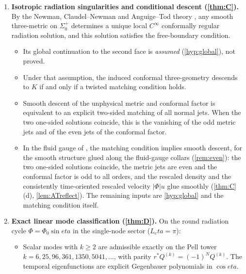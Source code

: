 \documentclass[11pt]{article}
\theoremstyle{canonmath}
\theoremstyle{canonpostulate}
\theoremstyle{canonproposition}
\theoremstyle{canonmath}
\theoremstyle{canonproposition}
\providecommand{\Klein}{\mathcal{K}}
\def\mathcal#1{#1}%
\def\eta{eta}%
\begin{document}
\begin{enumerate}[label=\textbf{\Alph*.}]
\begin{itemize}
  \item Conformally regular faces satisfy both conditions automatically (\cref{lem:B0}). The condition excludes velocity-dominated faces, but it is not a characterisation of conformal regularity: isotropic faces with scale factor $t^p$ pass for every $p>1/3$ (\cref{rem:powerlaw}). Radiation supplies conformally regular faces through \cref{thm:C}; we do not prove that radiation and the face condition together force conformal regularity.
  \end{itemize}
\item \textbf{Isotropic radiation singularities and conditional descent (\cref{thm:C}).} By the Newman, Claudel--Newman and Anguige--Tod theory \cite{Newman1993a, Newman1993b, ClaudelNewman1998, AnguigeTod1999a}, any smooth three-metric on $\Sigma_0^+$ determines a unique local $C^\infty$ conformally regular radiation solution, and this solution satisfies the free-boundary condition.
  \begin{itemize}
  \item Its global continuation to the second face is \emph{assumed} (\ref{hyp:global}), not proved.
  \item Under that assumption, the induced conformal three-geometry descends to $\Klein$ if and only if a twisted matching condition holds.
  \item Smooth descent of the unphysical metric and conformal factor is equivalent to an explicit two-sided matching of all normal jets. When the two one-sided solutions coincide, this is the vanishing of the odd metric jets and of the even jets of the conformal factor.
  \item In the fluid gauge of \cite{AnguigeTod1999a}, the matching condition implies smooth descent, for the smooth structure glued along the fluid-gauge collars (\cref{rem:even}): the two one-sided solutions coincide, the metric jets are even and the conformal factor is odd to all orders, and the rescaled density and the consistently time-oriented rescaled velocity $|\Phi|u$ glue smoothly (\cref{thm:C}(d), \cref{lem:ATreflect}). The remaining inputs are \ref{hyp:global} and the matching condition itself.
  \end{itemize}
\item \textbf{Exact linear mode classification (\cref{thm:D}).} On the round radiation cycle $\Phi = \Phi_0\sin\eta$ in the single-node sector ($L_\eta = \pi$):
  \begin{itemize}
  \item Scalar modes with $k\ge2$ are admissible exactly on the Pell tower $k = 6, 25, 96, 361, 1350, 5041, \dots$, with parity $r^*Q^{(k)} = (-1)^N Q^{(k)}$. The temporal eigenfunctions are explicit Gegenbauer polynomials in $\cos\eta$.

\end{itemize}
\end{enumerate}
\end{document}
